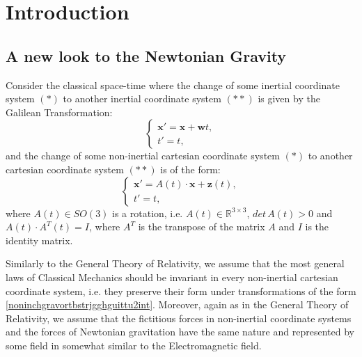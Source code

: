 \documentclass{article}
\theoremstyle{definition}
\theoremstyle{remark}
\renewcommand{\vec}[1]{\mathbf{#1}}
\newcommand{\R}{\mathbb{R}}
\newcommand{\er}{\eqref}
\newcommand{\R}{{\mathbb{R}}}
\newcommand{\er}{\eqref}
\begin{document}
\section{Introduction}
\subsection{A new look to the Newtonian Gravity}
Consider the classical space-time where the change of some inertial
coordinate system $(*)$ to another inertial coordinate system $(**)$
is given by the Galilean Transformation:
\begin{equation}\label{noninchgravortbstrjgghguittu1int}
\begin{cases}
\vec x'=\vec x+\vec wt,\\
t'=t,
\end{cases}
\end{equation}
and the change of some non-inertial cartesian coordinate system
$(*)$ to another cartesian coordinate system $(**)$ is of the form:
\begin{equation}\label{noninchgravortbstrjgghguittu2int}
\begin{cases}
\vec x'=A(t)\cdot\vec x+\vec z(t),\\
t'=t,
\end{cases}
\end{equation}
where $A(t)\in SO(3)$ is a rotation, i.e. $A(t)\in \R^{3\times 3}$,
$det\, A(t)>0$ and $A(t)\cdot A^T(t)=I$, where $A^T$ is the
transpose of the matrix $A$ and $I$ is the identity matrix.

 Similarly to the General Theory of Relativity, we assume that
the most general laws of Classical Mechanics should be invariant in
every non-inertial cartesian coordinate system, i.e. they preserve
their form under transformations of the form
\er{noninchgravortbstrjgghguittu2int}. Moreover, again as in the
General Theory of Relativity, we assume that the fictitious forces
in non-inertial coordinate systems and the forces of Newtonian
gravitation have the same nature and represented by some field in
somewhat similar to the Electromagnetic field.
\end{document}
